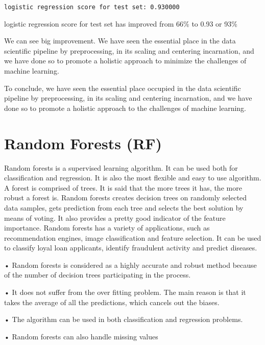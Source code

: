 \documentclass[11pt]{article}
\begin{document}
    \begin{Verbatim}[commandchars=\\\{\}]
logistic regression score for test set: 0.930000

    \end{Verbatim}

    logistic regression score for test set has improved from 66\% to 0.93 or
93\%

We can see big improvement. We have seen the essential place in the data
scientific pipeline by preprocessing, in its scaling and centering
incarnation, and we have done so to promote a holistic approach to
minimize the challenges of machine learning.

To conclude, we have seen the essential place occupied in the data
scientific pipeline by preprocessing, in its scaling and centering
incarnation, and we have done so to promote a holistic approach to the
challenges of machine learning.

    \section{Random Forests (RF)}\label{random-forests-rf}

Random forests is a supervised learning algorithm. It can be used both
for classification and regression. It is also the most flexible and easy
to use algorithm. A forest is comprised of trees. It is said that the
more trees it has, the more robust a forest is. Random forests creates
decision trees on randomly selected data samples, gets prediction from
each tree and selects the best solution by means of voting. It also
provides a pretty good indicator of the feature importance. Random
forests has a variety of applications, such as recommendation engines,
image classification and feature selection. It can be used to classify
loyal loan applicants, identify fraudulent activity and predict
diseases.

• Random forests is considered as a highly accurate and robust method
because of the number of decision trees participating in the process.

• It does not suffer from the over fitting problem. The main reason is
that it takes the average of all the predictions, which cancels out the
biases.

• The algorithm can be used in both classification and regression
problems.

• Random forests can also handle missing values
\end{document}
